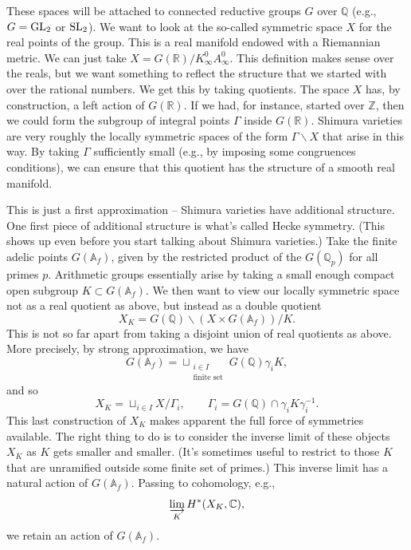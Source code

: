 \documentclass[reqno]{amsart} 
\begin{document}
These spaces will be attached to connected reductive groups $G$ over $\mathbb{Q}$ (e.g., $G = \operatorname{GL}_2$ or $\operatorname{SL}_2$).  We want to look at the so-called symmetric space $X$ for the real points of the group.  This is a real manifold endowed with a Riemannian metric.  We can just take $X = G(\mathbb{R}) / K_\infty^0 A_\infty^0$.  This definition makes sense over the reals, but we want something to reflect the structure that we started with over the rational numbers.  We get this by taking quotients.  The space $X$ has, by construction, a left action of $G(\mathbb{R})$.  If we had, for instance, started over $\mathbb{Z}$, then we could form the subgroup of integral points $\Gamma$ inside $G(\mathbb{R})$.  Shimura varieties are very roughly the locally symmetric spaces of the form $\Gamma \backslash X$ that arise in this way.  By taking $\Gamma$ sufficiently small (e.g., by imposing some congruences conditions), we can ensure that this quotient has the structure of a smooth real manifold.

This is just a first approximation -- Shimura varieties have additional structure.  One first piece of additional structure is what's called Hecke symmetry.  (This shows up even before you start talking about Shimura varieties.)  Take the finite adelic points $G(\mathbb{A}_f)$, given by the restricted product of the $G(\mathbb{Q}_p)$ for all primes $p$.  Arithmetic groups essentially arise by taking a small enough compact open subgroup $K \subset G(\mathbb{A}_f)$.  We then want to view our locally symmetric space not as a real quotient as above, but instead as a double quotient
\begin{equation*}
  X_K =
  G(\mathbb{Q}) \backslash  (X \times G(\mathbb{A}_f)) / K.
\end{equation*}
This is not so far apart from taking a disjoint union of real quotients as above.  More precisely, by strong approximation, we have
\begin{equation*}
  G(\mathbb{A}_f) = \sqcup_{
    \substack{
      i \in I  \\
      \text{finite set}      
    }
  }
  G(\mathbb{Q}) \gamma_i K,
\end{equation*}
and so
\begin{equation*}
  X_K = \sqcup_{i \in I} X / \Gamma_i , \qquad
  \Gamma_i = G(\mathbb{Q}) \cap \gamma_i K \gamma_i^{-1}.
\end{equation*}
This last construction of $X_K$ makes apparent the full force of symmetries available.  The right thing to do is to consider the inverse limit of these objects $X_K$ as $K$ gets smaller and smaller.  (It's sometimes useful to restrict to those $K$ that are unramified outside some finite set of primes.)  This inverse limit has a natural action of $G(\mathbb{A}_f)$.  Passing to cohomology, e.g.,
\begin{equation*}
  \varinjlim_{K} H^\ast(X_K, \mathbb{C}),
\end{equation*}
we retain an action of $G(\mathbb{A}_f)$.
\end{document}
